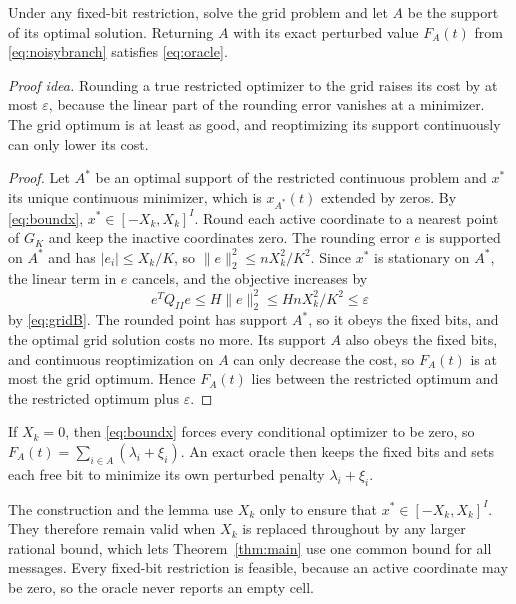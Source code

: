 \begin{lemma}\label{lem:gridoracle}
Under any fixed-bit restriction, solve the grid problem and let $A$ be the
support of its optimal solution. Returning $A$ with its exact perturbed
value $F_A(t)$ from \eqref{eq:noisybranch} satisfies \eqref{eq:oracle}.
\end{lemma}

\emph{Proof idea.} Rounding a true restricted optimizer to the grid raises
its cost by at most $\varepsilon$, because the linear part of the
rounding error vanishes at a minimizer. The grid optimum is at least as
good, and reoptimizing its support continuously can only lower its cost.

\begin{proof}
Let $A^*$ be an optimal support of the restricted continuous problem and
$x^*$ its unique continuous minimizer, which is $x_{A^*}(t)$ extended by
zeros. By \eqref{eq:boundx}, $x^*\in[-X_k,X_k]^I$. Round each active
coordinate to a nearest point of $G_K$ and keep the inactive coordinates
zero. The rounding error $e$ is supported on $A^*$ and has
$|e_i|\le X_k/K$, so $\|e\|_2^2\le nX_k^2/K^2$. Since $x^*$ is
stationary on $A^*$, the linear term in $e$ cancels, and the objective
increases by
\[
 e^TQ_{II}e\le H\|e\|_2^2\le HnX_k^2/K^2\le\varepsilon
\]
by \eqref{eq:gridB}. The rounded point has support $A^*$, so it obeys the
fixed bits, and the optimal grid solution costs no more. Its support $A$
also obeys the fixed bits, and continuous reoptimization on $A$ can only
decrease the cost, so $F_A(t)$ is at most the grid optimum. Hence $F_A(t)$
lies between the restricted optimum and the restricted optimum plus
$\varepsilon$.
\end{proof}

If $X_k=0$, then \eqref{eq:boundx} forces every conditional optimizer to
be zero, so $F_A(t)=\sum_{i\in A}(\lambda_i+\xi_i)$. An exact oracle then
keeps the fixed bits and sets each free bit to minimize its own perturbed
penalty $\lambda_i+\xi_i$.

The construction and the lemma use $X_k$ only to ensure that
$x^*\in[-X_k,X_k]^I$. They therefore remain valid when $X_k$ is replaced
throughout by any larger rational bound, which lets
Theorem~\ref{thm:main} use one common bound for all messages. Every
fixed-bit restriction is feasible, because an active coordinate may be
zero, so the oracle never reports an empty cell.

